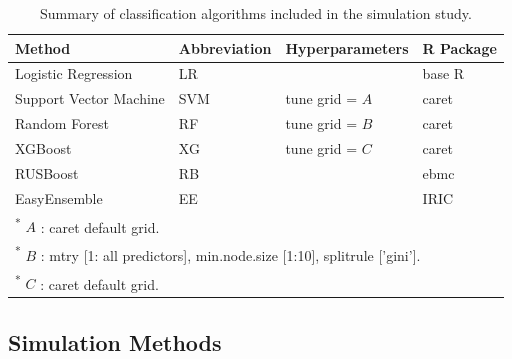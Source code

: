 \documentclass[AMA,STIX1COL,]{WileyNJD-v2}
\begin{document}
\begin{table}[!h]

\caption{\label{tab:algs} Summary of classification algorithms included in the simulation study.}
\centering
\begin{tabular}[t]{llll}
\toprule
Method & Abbreviation & Hyperparameters & R Package\\
\midrule
Logistic Regression & LR &  & base R \cite{r}\\
\addlinespace
Support Vector Machine & SVM & tune grid = $A$ & caret \cite{caret}\\
\addlinespace
Random Forest & RF & tune grid = $B$ & caret \cite{caret}\\
\addlinespace
XGBoost & XG & tune grid = $C$ & caret \cite{caret}\\
\addlinespace
RUSBoost & RB &  & ebmc \cite{ebmc}\\
\addlinespace
EasyEnsemble & EE &  & IRIC \cite{iric}\\
\bottomrule
\multicolumn{4}{l}{\rule{0pt}{1em}\textsuperscript{*}     $A$ : caret default grid.}\\
\multicolumn{4}{l}{\rule{0pt}{1em}\textsuperscript{*}     $B$ : mtry [1: all predictors], min.node.size [1:10], splitrule ['gini'].}\\
\multicolumn{4}{l}{\rule{0pt}{1em}\textsuperscript{*}     $C$ : caret default grid.}\\
\end{tabular}
\end{table}

\hypertarget{simulation-methods}{%
\subsection{Simulation Methods}\label{simulation-methods}}
\end{document}

